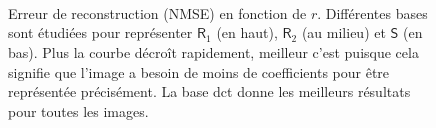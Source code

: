 \begin{figure}[t]
    \centering
    \\
    \\
    \\
    \caption{Erreur de reconstruction (NMSE) en fonction de $r$. Différentes bases sont étudiées pour représenter $\mathsf{R}_1$ (en haut), $\mathsf{R}_2$ (au milieu) et $\mathsf{S}$ (en bas). Plus la courbe décroît rapidement, meilleur c'est puisque cela signifie que l'image a besoin de moins de coefficients pour être représentée précisément. La base \gls{dct} donne les meilleurs résultats pour toutes les images.
        \protect\label{fig-best-basis}}
\end{figure}





